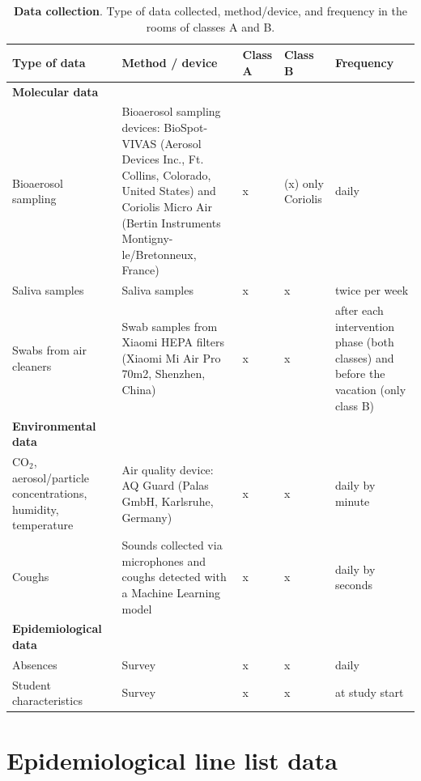 \documentclass[fleqn,11pt]{wlscirep_supp}
\begin{document}
\begin{table}[!htpb]
    \footnotesize
    \centering
    \caption{\textbf{Data collection}. Type of data collected, method/device, and frequency in the rooms of classes A and B.}
    \begin{tabular}{p{3.5cm}p{6cm} p{1cm} p{1cm} p{3cm}}
    \midrule
    Type of data & Method / device & Class A & Class B & Frequency \\
    \midrule
    \textbf{Molecular data} \\
    \midrule
    Bioaerosol sampling & Bioaerosol sampling devices: BioSpot-VIVAS (Aerosol Devices Inc., Ft. Collins, Colorado, United States) and Coriolis Micro Air (Bertin Instruments Montigny-le/Bretonneux, France) & x & (x) \newline only Coriolis & daily \\
    Saliva samples & Saliva samples & x & x & twice per week \\
    Swabs from air cleaners & Swab samples from Xiaomi HEPA filters (Xiaomi Mi Air Pro 70m2, Shenzhen, China) & x & x & after each intervention phase (both classes) and before the vacation (only class B) \\ 
    \midrule
    \textbf{Environmental data} \\
    \midrule
    CO$_2$, aerosol/particle concentrations, humidity, temperature & Air quality device: AQ Guard (Palas GmbH, Karlsruhe, Germany) & x & x & daily by minute \\
    Coughs & Sounds collected via microphones and coughs detected with a Machine Learning model \cite{Bertschinger2023CBMS} & x & x & daily by seconds \\
    \midrule
    \textbf{Epidemiological data} \\
    \midrule
    Absences & Survey & x & x & daily \\
    Student characteristics & Survey & x & x & at study start \\
    \bottomrule
    \end{tabular}
    \label{tab:data}
\end{table}

\clearpage

\section{Epidemiological line list data}\label{sec:case-data}
\end{document}
